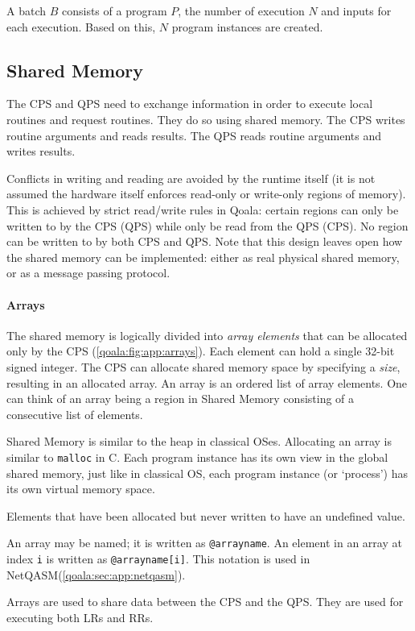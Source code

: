 A batch $B$ consists of a program $P$, the number of execution $N$ and inputs for each execution. Based on this, $N$ program instances are created.


\subsection{Shared Memory}
\label{qoala:sec:app:shared_memory}
The CPS and QPS need to exchange information in order to execute local routines and request routines. They do so using shared memory.
The CPS writes routine arguments and reads results.
The QPS reads routine arguments and writes results.

Conflicts in writing and reading are avoided by the runtime itself (it is not assumed the hardware itself enforces read-only or write-only regions of memory).
This is achieved by strict read/write rules in Qoala: certain regions can only be written to by the CPS (QPS) while only be read from the QPS (CPS).
No region can be written to by both CPS and QPS.
Note that this design leaves open how the shared memory can be implemented: either as real physical shared memory, or as a message passing protocol.


\paragraph{Arrays}
The shared memory is logically divided into \textit{array elements} that can be allocated only by the CPS (\cref{qoala:fig:app:arrays}).
Each element can hold a single 32-bit signed integer.
The CPS can allocate shared memory space by specifying a \textit{size}, resulting in an allocated array.
An array is an ordered list of array elements. 
One can think of an array being a region in Shared Memory consisting of a consecutive list of elements.

Shared Memory is similar to the heap in classical OSes. Allocating an array is similar to \texttt{malloc} in C. Each program instance has its own view in the global shared memory, just like in classical OS, each program instance (or `process') has its own virtual memory space.

Elements that have been allocated but never written to have an undefined value.

An array may be named; it is written as \texttt{@arrayname}. An element in an array at index \texttt{i} is written as \texttt{@arrayname[i]}. This notation is used in NetQASM(\cref{qoala:sec:app:netqasm}).

Arrays are used to share data between the CPS and the QPS.
They are used for executing both LRs and RRs.

